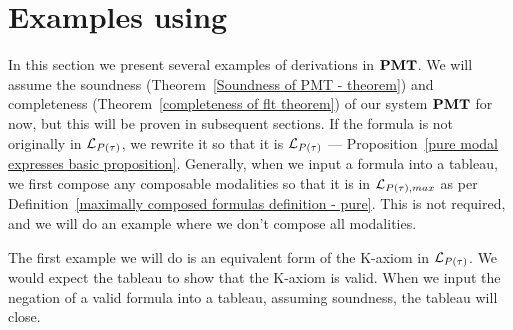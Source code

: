 \section{Examples using \pmt}\label{pure tableau examples section}

\par In this section we present several examples of derivations in $\textbf{PMT}$. We will assume the soundness (Theorem~\ref{Soundness of PMT - theorem}) and completeness (Theorem~\ref{completeness of flt theorem}) of our system $\textbf{PMT}$ for now, but this will be proven in subsequent sections. If the formula is not originally in $\mathcal{L}_{P(\tau)}$, we rewrite it so that it is $\mathcal{L}_{P(\tau)}$ --- Proposition~\ref{pure modal expresses basic proposition}. Generally, when we input a formula into a tableau, we first compose any composable modalities so that it is in $\mathcal{L}_{P(\tau),max}$ as per Definition~\ref{maximally composed formulas definition - pure}. This is not required, and we will do an example where we don't compose all modalities.

\par The first example we will do is an equivalent form of the K-axiom in $\mathcal{L}_{P(\tau)}$. We would expect the tableau to show that the K-axiom is valid. When we input the negation of a valid formula into a tableau, assuming soundness, the tableau will close.

